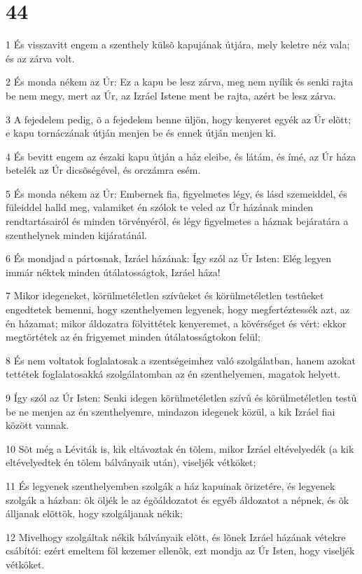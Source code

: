 \chapter{44}

\par 1 És visszavitt engem a szenthely külsõ kapujának útjára, mely keletre néz vala; és az zárva volt.
\par 2 És monda nékem az Úr: Ez a kapu be lesz zárva, meg nem nyílik és senki rajta be nem megy, mert az Úr, az Izráel Istene ment be rajta, azért be lesz zárva.
\par 3 A fejedelem pedig, õ a fejedelem benne üljön, hogy kenyeret egyék az Úr elõtt; e kapu tornáczának útján menjen be és ennek útján menjen ki.
\par 4 És bevitt engem az északi kapu útján a ház eleibe, és látám, és ímé, az Úr háza betelék az Úr dicsõségével, és orczámra esém.
\par 5 És monda nékem az Úr: Embernek fia, figyelmetes légy, és lásd szemeiddel, és füleiddel halld meg, valamiket én szólok te veled az Úr házának minden rendtartásairól és minden törvényérõl, és légy figyelmetes a háznak bejáratára a szenthelynek minden kijáratánál.
\par 6 És mondjad a pártosnak, Izráel házának: Így szól az Úr Isten: Elég legyen immár néktek minden útálatosságtok, Izráel háza!
\par 7 Mikor idegeneket, körülmetéletlen szívûeket és körülmetéletlen testûeket engedtetek bemenni, hogy szenthelyemen legyenek, hogy megfertéztessék azt, az én házamat; mikor áldozatra fölvittétek kenyeremet, a kövérséget és vért: ekkor megtörtétek az én frigyemet minden útálatosságtokon felül;
\par 8 És nem voltatok foglalatosak a szentségeimhez való szolgálatban, hanem azokat tettétek foglalatosakká szolgálatomban az én szenthelyemen, magatok helyett.
\par 9 Így szól az Úr Isten: Senki idegen körülmetéletlen szívû és körülmetéletlen testû be ne menjen az én szenthelyemre, mindazon idegenek közül, a kik Izráel fiai között vannak.
\par 10 Sõt még a Léviták is, kik eltávoztak én tõlem, mikor Izráel eltévelyedék (a kik eltévelyedtek én tõlem bálványaik után), viseljék vétköket;
\par 11 És legyenek szenthelyemben szolgák a ház kapuinak õrizetére, és legyenek szolgák a házban: õk öljék le az égõáldozatot és egyéb áldozatot a népnek, és õk álljanak elõttök, hogy szolgáljanak nékik;
\par 12 Mivelhogy szolgáltak nékik bálványaik elõtt, és lõnek Izráel házának vétekre csábítói: ezért emeltem föl kezemer ellenök, ezt mondja az Úr Isten, hogy viseljék vétköket.
